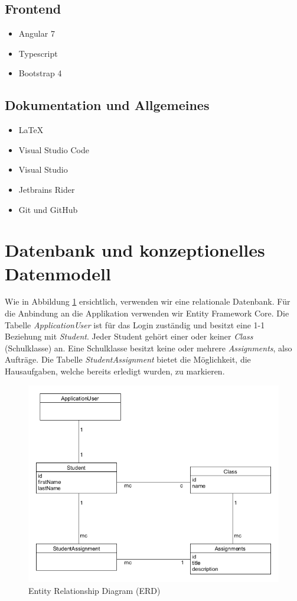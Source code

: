 \documentclass[a4paper, titlepage]{article}
\begin{document}
    \subsection{Frontend}
    \begin{itemize}
    \item Angular 7
    \item Typescript
    \item Bootstrap 4
    \end{itemize}
    \subsection{Dokumentation und Allgemeines}
    \begin{itemize}
        \item \LaTeX{}
        \item Visual Studio Code
        \item Visual Studio
        \item Jetbrains Rider
        \item Git und GitHub
    \end{itemize}

    \section{Datenbank und konzeptionelles Datenmodell}
    Wie in Abbildung \ref{erd} ersichtlich, verwenden wir eine relationale Datenbank. Für die Anbindung an die Applikation
    verwenden wir Entity Framework Core. Die Tabelle \emph{ApplicationUser}
    ist für das Login zuständig und besitzt eine 1-1 Beziehung mit \emph{Student}.
    Jeder Student gehört einer oder keiner \emph{Class} (Schulklasse) an. Eine Schulklasse besitzt
    keine oder mehrere \emph{Assignments}, also Aufträge. Die Tabelle \emph{StudentAssignment}
    bietet die Möglichkeit, die Hausaufgaben, welche bereits erledigt wurden,
    zu markieren.
    \begin{figure}
        \includegraphics[width=\textwidth]{uml}
        \caption{Entity Relationship Diagram (ERD)}
        \label{erd}
    \end{figure}
\end{document}
